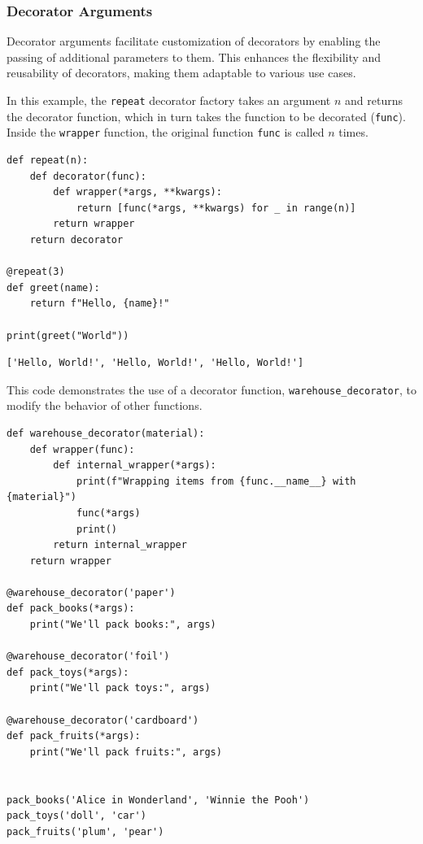 \subsubsection{Decorator Arguments}
Decorator arguments facilitate customization of decorators by enabling the passing of additional parameters to them. This enhances the flexibility and reusability of decorators, making them adaptable to various use cases.

In this example, the \texttt{repeat} decorator factory takes an argument $n$ and returns the decorator function, which in turn takes the function to be decorated (\texttt{func}). Inside the \texttt{wrapper} function, the original function \texttt{func} is called $n$ times.

\begin{codebox}
\begin{verbatim}
def repeat(n):
    def decorator(func):
        def wrapper(*args, **kwargs):
            return [func(*args, **kwargs) for _ in range(n)]
        return wrapper
    return decorator

@repeat(3)
def greet(name):
    return f"Hello, {name}!"

print(greet("World"))
\end{verbatim}
\end{codebox}

\begin{verbatim}
['Hello, World!', 'Hello, World!', 'Hello, World!']
\end{verbatim}


This code demonstrates the use of a decorator function, \texttt{warehouse\_decorator}, to modify the behavior of other functions.

\begin{codebox}
\begin{verbatim}
def warehouse_decorator(material):
    def wrapper(func):
        def internal_wrapper(*args):
            print(f"Wrapping items from {func.__name__} with {material}")
            func(*args)
            print()
        return internal_wrapper
    return wrapper

@warehouse_decorator('paper')
def pack_books(*args):
    print("We'll pack books:", args)

@warehouse_decorator('foil')
def pack_toys(*args):
    print("We'll pack toys:", args)

@warehouse_decorator('cardboard')
def pack_fruits(*args):
    print("We'll pack fruits:", args)


pack_books('Alice in Wonderland', 'Winnie the Pooh')
pack_toys('doll', 'car')
pack_fruits('plum', 'pear')
\end{verbatim}
\end{codebox}


